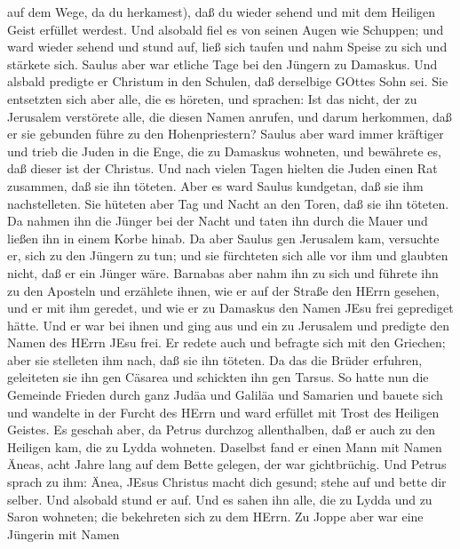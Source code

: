 auf dem Wege, da du herkamest), daß du wieder sehend und mit dem
Heiligen Geist erfüllet werdest.  Und alsobald fiel es von
seinen Augen wie Schuppen; und ward wieder sehend  und
stund auf, ließ sich taufen und nahm Speise zu sich und stärkete sich.
Saulus aber war etliche Tage bei den Jüngern zu Damaskus. 
Und alsbald predigte er Christum in den Schulen, daß derselbige GOttes
Sohn sei.  Sie entsetzten sich aber alle, die es höreten,
und sprachen: Ist das nicht, der zu Jerusalem verstörete alle, die
diesen Namen anrufen, und darum herkommen, daß er sie gebunden führe zu
den Hohenpriestern?  Saulus aber ward immer kräftiger und
trieb die Juden in die Enge, die zu Damaskus wohneten, und bewährete es,
daß dieser ist der Christus.  Und nach vielen Tagen hielten
die Juden einen Rat zusammen, daß sie ihn töteten.  Aber es
ward Saulus kundgetan, daß sie ihm nachstelleten. Sie hüteten aber Tag
und Nacht an den Toren, daß sie ihn töteten.  Da nahmen ihn
die Jünger bei der Nacht und taten ihn durch die Mauer und ließen ihn in
einem Korbe hinab.  Da aber Saulus gen Jerusalem kam,
versuchte er, sich zu den Jüngern zu tun; und sie fürchteten sich alle
vor ihm und glaubten nicht, daß er ein Jünger wäre. 
Barnabas aber nahm ihn zu sich und führete ihn zu den Aposteln und
erzählete ihnen, wie er auf der Straße den HErrn gesehen, und er mit ihm
geredet, und wie er zu Damaskus den Namen JEsu frei geprediget hätte.
 Und er war bei ihnen und ging aus und ein zu Jerusalem und
predigte den Namen des HErrn JEsu frei.  Er redete auch und
befragte sich mit den Griechen; aber sie stelleten ihm nach, daß sie ihn
töteten.  Da das die Brüder erfuhren, geleiteten sie ihn
gen Cäsarea und schickten ihn gen Tarsus.  So hatte nun die
Gemeinde Frieden durch ganz Judäa und Galiläa und Samarien und bauete
sich und wandelte in der Furcht des HErrn und ward erfüllet mit Trost
des Heiligen Geistes.  Es geschah aber, da Petrus durchzog
allenthalben, daß er auch zu den Heiligen kam, die zu Lydda wohneten.
 Daselbst fand er einen Mann mit Namen Äneas, acht Jahre
lang auf dem Bette gelegen, der war gichtbrüchig.  Und
Petrus sprach zu ihm: Änea, JEsus Christus macht dich gesund; stehe auf
und bette dir selber. Und alsobald stund er auf.  Und es
sahen ihn alle, die zu Lydda und zu Saron wohneten; die bekehreten sich
zu dem HErrn.  Zu Joppe aber war eine Jüngerin mit Namen
